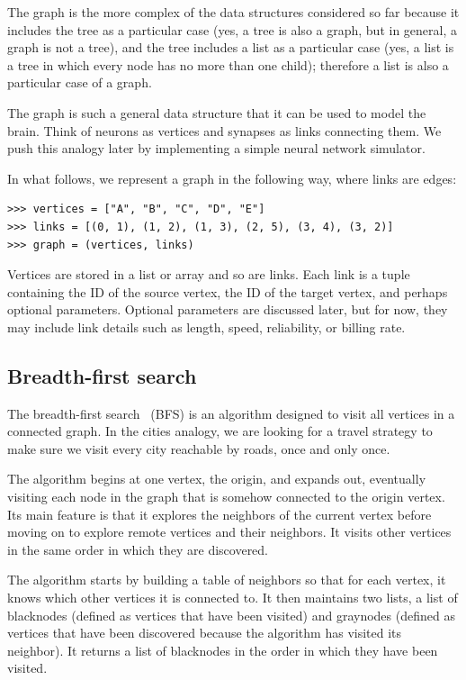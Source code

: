 \documentclass[justified, sixbynine]{tufte-book}
\theoremstyle{plain}%
\newtheorem * {corollary}{Corollary}
\theoremstyle{definition}
\theoremstyle{remark}
\newtheorem * {remark}{Remark}
\newtheorem * {note}{Note}
\begin{document}
\begin{fullwidth}
The graph is the more complex of the data structures considered so far because it includes the tree as a particular case (yes, a tree is also a graph, but in general, a graph is not a tree), and the tree includes a list as a particular case (yes, a list is a tree in which every node has no more than one child); therefore a list is also a particular case of a graph.

The graph is such a general data structure that it can be used to model the brain. Think of neurons as vertices and synapses as links connecting them. We push this analogy later by implementing a simple neural network simulator.

In what follows, we represent a graph in the following way, where links are edges:

\begin{lstlisting}
>>> vertices = ["A", "B", "C", "D", "E"]
>>> links = [(0, 1), (1, 2), (1, 3), (2, 5), (3, 4), (3, 2)]
>>> graph = (vertices, links)
\end{lstlisting}

Vertices are stored in a list or array and so are links. Each link is a tuple containing the ID of the source vertex, the ID of the target vertex, and perhaps optional parameters.  Optional parameters are discussed later, but for now, they may include link details such as length, speed, reliability, or billing rate.

\subsection{Breadth-first search}


The breadth-first search~\cite{bfs} (BFS) is an algorithm designed to visit all vertices in a connected graph. In the cities analogy, we are looking for a travel strategy to make sure we visit every city reachable by roads, once and only once.

The algorithm begins at one vertex, the origin, and expands out, eventually visiting each node in the graph that is somehow connected to the origin vertex. Its main feature is that it explores the neighbors of the current vertex before moving on to explore remote vertices and their neighbors. It visits other vertices in the same order in which they are discovered.

The algorithm starts by building a table of neighbors so that for each vertex, it knows which other vertices it is connected to. It then maintains two lists, a list of blacknodes (defined as vertices that have been visited) and graynodes (defined as vertices that have been discovered because the algorithm has visited its neighbor). It returns a list of blacknodes in the order in which they have been visited.


\end{fullwidth}
\end{document}
